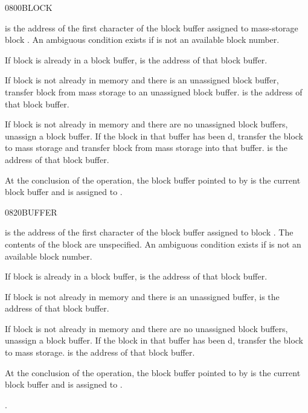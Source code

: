 \begin{worddef}{0800}{BLOCK}
\item {}

	 is the address of the first character of the
	block buffer assigned to mass-storage block . An
	ambiguous condition exists if  is not an available
	block number.

	If block  is already in a block buffer, 
	is the address of that block buffer.

	If block  is not already in memory and there is an
	unassigned block buffer, transfer block  from mass
	storage to an unassigned block buffer.  is the
	address of that block buffer.

	If block  is not already in memory and there are no
	unassigned block buffers, unassign a block buffer. If the block
	in that buffer has been d, transfer the block to
	mass storage and transfer block  from mass storage into
	that buffer.  is the address of that block buffer.

	At the conclusion of the operation, the block buffer pointed to
	by  is the current block buffer and is assigned to
	.
\end{worddef}


\begin{worddef}{0820}{BUFFER}
\item {}

	 is the address of the first character of the
	block buffer assigned to block . The contents of the
	block are unspecified. An ambiguous condition exists if 
	is not an available block number.

	If block  is already in a block buffer, 
	is the address of that block buffer.

	If block  is not already in memory and there is an
	unassigned 	buffer,  is the address of that block
	buffer.

	If block  is not already in memory and there are no
	unassigned block buffers, unassign a block buffer. If the block
	in that buffer has been d, transfer the block to
	mass storage.  is the address of that block buffer.

	At the conclusion of the operation, the block buffer pointed to
	by  is the current block buffer and is assigned to
	.

\see {}.
\end{worddef}


